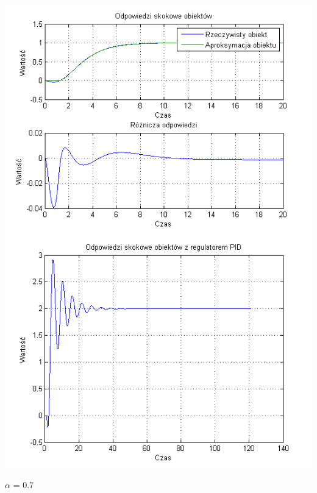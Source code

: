 \documentclass[10pt,a4paper]{article}
\begin{document}
\begin{center}
\includegraphics[scale=1]{images/dwa/skrypt_235.png}\\
\includegraphics[scale=1]{images/dwa/skrypt_236.png}\\
\end{center}
\newpage
$\alpha$ = 0.7
\end{document}
